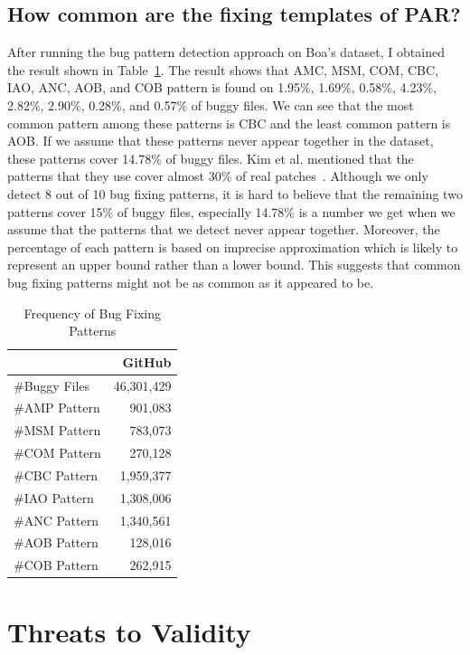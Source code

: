 \documentclass{sig-alternate-05-2015}
\begin{document}
\subsection{How common are the fixing templates of PAR?}\label{sec:freqfixpattern}
After running the bug pattern detection approach on Boa's dataset, I obtained the result shown in Table~\ref{tab:freqpattern}. The result shows that AMC, MSM, COM, CBC, IAO, ANC, AOB, and COB pattern is found on 1.95\%, 1.69\%, 0.58\%, 4.23\%, 2.82\%, 2.90\%, 0.28\%, and 0.57\% of buggy files. We can see that the most common pattern among these patterns is CBC and the least common pattern is AOB. If we assume that these patterns never appear together in the dataset, these patterns cover 14.78\% of buggy files. Kim et al. mentioned that the patterns that they use cover almost 30\% of real patches~\cite{kim2013}. Although we only detect 8 out of 10 bug fixing patterns, it is hard to believe that the remaining two patterns cover 15\% of buggy files, especially 14.78\% is a number we get when we assume that the patterns that we detect never appear together. Moreover, the percentage of each pattern is based on imprecise approximation which is likely to represent an upper bound rather than a lower bound. This suggests that common bug fixing patterns might not be as common as it appeared to be.

\begin{table}[!htb]
	\caption{Frequency of Bug Fixing Patterns}\label{tab:freqpattern}
	\centering
	\begin{tabular}{lr} 
		\hline
		& \textbf{GitHub}\\
		\hline
		\#Buggy Files & 46,301,429 \\ 
		\#AMP Pattern & 901,083 \\
		\#MSM Pattern & 783,073 \\
		\#COM Pattern & 270,128 \\ 
		\#CBC Pattern & 1,959,377 \\  
		\#IAO Pattern & 1,308,006 \\  
		\#ANC Pattern & 1,340,561 \\  
		\#AOB Pattern & 128,016 \\  
		\#COB Pattern & 262,915 \\   
		\hline
	\end{tabular}
\end{table}

\section{Threats to Validity} 
\end{document}
